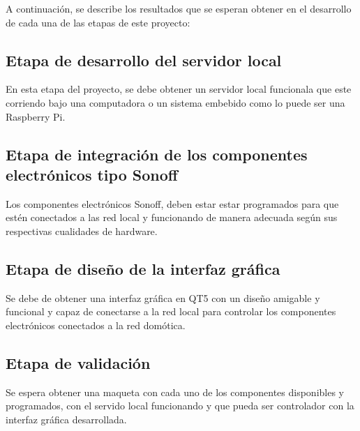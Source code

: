 A continuación, se describe los resultados que se esperan obtener en el desarrollo de cada una de las etapas de este proyecto:

\subsection{Etapa de desarrollo del servidor local}
En esta etapa del proyecto, se debe obtener un servidor local funcionala que este corriendo bajo una computadora o un sistema embebido como lo puede ser una Raspberry Pi.

\subsection{Etapa de integración de los componentes electrónicos tipo Sonoff}
Los componentes electrónicos Sonoff, deben estar estar programados para que estén conectados a las red local y funcionando de manera adecuada según sus respectivas cualidades de hardware.

\subsection{Etapa de diseño de la interfaz gráfica}
Se debe de obtener una interfaz gráfica en QT5 con un diseño amigable y funcional y capaz de conectarse a la red local para controlar los componentes electrónicos conectados a la red domótica.

\subsection{Etapa de validación}
Se espera obtener una maqueta con cada uno de los componentes disponibles y programados, con el servido local funcionando y que pueda ser controlador con la interfaz gráfica desarrollada.


